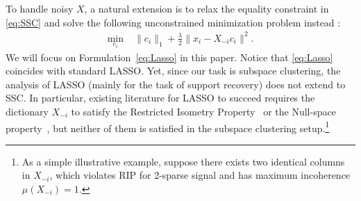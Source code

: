 \documentclass[twoside,11pt]{article}
\numberwithin{equation}{section}
\begin{document}

To handle noisy $X$, a natural extension is to relax the equality constraint in \eqref{eq:SSC} and solve the following unconstrained minimization problem instead \citep{elhamifar2012ssc_journal}:
\begin{equation}\label{eq:Lasso}
\begin{aligned}
\min_{c_i} \; &\|c_i\|_1+\frac{\lambda}{2}\|x_i-X_{-i}c_i\|^2.
\end{aligned}
\end{equation}
We will focus on Formulation~\eqref{eq:Lasso} in this paper. Notice that \eqref{eq:Lasso} coincides with standard LASSO. Yet, since our task is subspace clustering, the analysis of LASSO (mainly for the task of support recovery) does not extend to SSC. In particular, existing literature for LASSO to succeed requires the dictionary $X_{-i}$ to satisfy the Restricted Isometry Property~\citep[RIP for short;][]{candes2008RIP} or the Null-space property~\citep{donoho2006BPDN},  but neither of them is satisfied in the subspace clustering setup.\footnote{As a simple illustrative example, suppose there exists two identical columns in $X_{-i}$, which violates RIP for 2-sparse signal and has maximum incoherence $\mu(X_{-i})=1$.}
\end{document}
